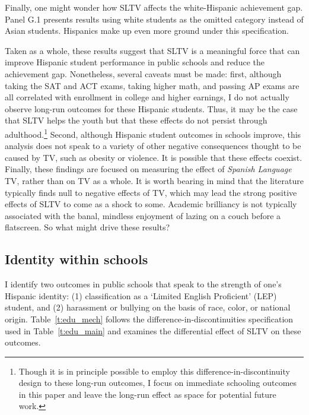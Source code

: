 \documentclass[11pt]{article}
\begin{document}
Finally, one might wonder how SLTV affects the white-Hispanic achievement gap. Panel G.1 presents results using white students as the omitted category instead of Asian students. Hispanics make up even more ground under this specification. 

Taken as a whole, these results suggest that SLTV is a meaningful force that can improve Hispanic student performance in public schools and reduce the achievement gap. Nonetheless, several caveats must be made: first, although taking the SAT and ACT exams, taking higher math, and passing AP exams are all correlated with enrollment in college and higher earnings, I do not actually observe long-run outcomes for these Hispanic students. Thus, it may be the case that SLTV helps the youth but that these effects do not persist through adulthood.\footnote{ Though it is in principle possible to employ this difference-in-discontinuity design to these long-run outcomes, I focus on immediate schooling outcomes in this paper and leave the long-run effect as space for potential future work.} Second, although Hispanic student outcomes in schools improve, this analysis does not speak to a variety of other negative consequences thought to be caused by TV, such as obesity or violence. It is possible that these effects coexist. Finally, these findings are focused on measuring the effect of \textit{Spanish Language} TV, rather than on TV as a whole. It is worth bearing in mind that the literature typically finds null to negative effects of TV, which may lead the strong positive effects of SLTV to come as a shock to some. Academic brilliancy is not typically associated with the banal, mindless enjoyment of lazing on a couch before a flatscreen. So what might drive these results?

\subsection{Identity within schools}

I identify two outcomes in public schools that speak to the strength of one's Hispanic identity: (1) classification as a `Limited English Proficient' (LEP) student, and (2) harassment or bullying on the basis of race, color, or national origin. Table~\ref{t:edu_mech} follows the difference-in-discontinuities specification used in Table~\ref{t:edu_main} and examines the differential effect of SLTV on these outcomes.
\end{document}
